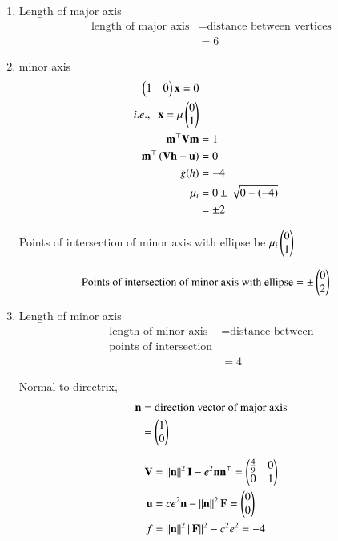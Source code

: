\documentclass[journal,12pt,twocolumn]{IEEEtran}
\begin{document}
\begin{enumerate}
\item Length of major axis
\begin{align}
	\text{length of major axis}	&= \text{distance between vertices}\\
					&=6
\end{align}

\item minor axis
	\begin{align}
	\begin{pmatrix}1&0\end{pmatrix} \mathbf{x} = 0\\
	i.e., \;\; \mathbf{x} = \mu \begin{pmatrix}0\\1\end{pmatrix}\\	
	\mathbf{m}^{\top}\mathbf{V}\mathbf{m} &= 1\\
	\mathbf{m}^{\top}\left(\mathbf{V}\mathbf{h}+\mathbf{u}\right) &= 0\\
	g(h) &= -4\\
	{\mu}_i &= 0 \pm \sqrt{0 - \left(-4\right)}\\
		&= \pm 2
	\end{align}

Points of intersection of minor axis with ellipse be $\mu_i \begin{pmatrix}0\\1\end{pmatrix}$

\begin{align}
	\text{Points of intersection of minor axis with ellipse} &= \pm \begin{pmatrix}0\\2\end{pmatrix}
\end{align}

\item Length of minor axis
\begin{align}
	\text{length of minor axis} &= \text{distance between} \\ \text{points of intersection}\\
				    &= 4
\end{align}

Normal to directrix,
\begin{align}
	\mathbf{n} &= \text{direction vector of major axis}\\
		&= \begin{pmatrix}1\\0\end{pmatrix}
\end{align}

\begin{align}
	\mathbf{V} &= \left\lVert\mathbf{n}\right\rVert^2 \mathbf{I} - e^2 \mathbf{n} \mathbf{n}^{\top} = \begin{pmatrix}\frac{4}{9}&0\\0&1\end{pmatrix}	\label{eq:1} \\
	\mathbf{u} &= ce^2 \mathbf{n} - \left\lVert\mathbf{n}\right\rVert^2\mathbf{F} = \begin{pmatrix}0\\0\end{pmatrix}	\label{eq:2}\\
	f &= \left\lVert\mathbf{n}\right\rVert^2 \left\lVert\mathbf{F}\right\rVert^2 - c^2e^2  = -4 \label{eq:3}
\end{align}


\end{enumerate}
\end{document}
